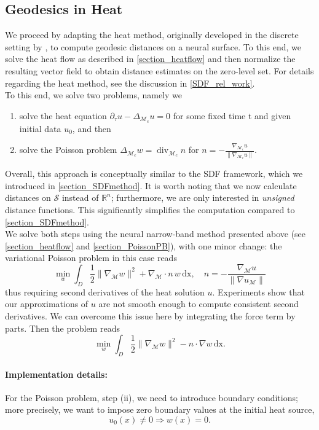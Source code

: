 \documentclass[draft,12pt,openany]{book}
\newcommand{\R}{\mathbb{R}}
\def\S{\mathcal{S}}
\theoremstyle{plainnormal}
\theoremstyle{remark}
\begin{document}
\subsection{Geodesics in Heat}
We proceed by adapting the heat method, originally developed in the discrete setting by \cite{Crane_2013}, to compute geodesic distances on a neural surface. To this end, we solve the heat flow as described in \cref{section_heatflow} and then normalize the resulting vector field to obtain distance estimates on the zero-level set. For details regarding the heat method, see the discussion in \cref{SDF_rel_work}. \\
To this end, we solve two problems, namely we
\begin{enumerate}
    \item solve the heat equation $\partial_\tau u - \Delta_{\mathcal{M}_c} u = 0$ for some fixed time t and given initial data $u_0$, and then
    \item solve the Poisson problem $\Delta_{\mathcal{M}_c} w = \operatorname{div}_{\mathcal{M}_c}  n$ for $ n = -\frac{\nabla_{\mathcal{M}_c} u}{\|\nabla_{\mathcal{M}_c} u\|}$.
\end{enumerate}
Overall, this approach is conceptually similar to the SDF framework, which we introduced in \cref{section_SDFmethod}. 
It is worth noting that we now calculate distances on $\S$ instead of $\R^n$; furthermore, we are only interested in \emph{unsigned} distance functions. This significantly simplifies the computation compared to \cref{section_SDFmethod}.\\
We solve both steps using the neural narrow-band method presented above (see \cref{section_heatflow} and \cref{section_PoissonPB}), with one minor change: the variational Poisson problem in this case reads 
$$\min_w\int_D \frac{1}{2}\|\nabla_\mathcal{M}w\|^2 + \nabla_{\mathcal{M}} \cdot n \, w \,\mathrm{dx}, \quad n = - \frac{\nabla_{\mathcal{M}} u}{\|\nabla u_{\mathcal{M}}\|}$$
thus requiring second derivatives of the heat solution $u$. Experiments show that our approximations of $u$ are not smooth enough to compute consistent second derivatives. We can overcome this issue here by integrating the force term by parts. Then the problem reads 
$$\min_w\int_D \frac{1}{2}\|\nabla_\mathcal{M}w\|^2 - n\cdot \nabla w \,\mathrm{dx}.$$
\paragraph{Implementation details:}
For the Poisson problem, step (ii), we need to introduce boundary conditions; more precisely, we want to impose zero boundary values at the initial heat source, $$u_0(x) \neq 0 \Rightarrow w(x) = 0.$$
\end{document}
